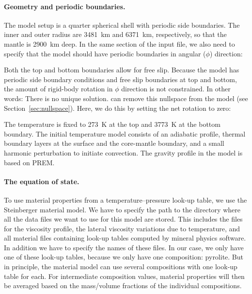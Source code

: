 \paragraph{Geometry and periodic boundaries.}
The model setup is a quarter spherical shell with periodic side boundaries. The inner and outer radius are 3481~\si{\km} and 6371~\si{\km}, respectively, so that the mantle is 2900~\si{\km} deep. In the same section of the input file, we also need to specify that the model should have periodic boundaries in angular ($\phi$) direction:

Both the top and bottom boundaries allow for free slip. Because the model has periodic side boundary conditions and free slip boundaries at top and bottom, the amount of rigid-body rotation in $\phi$ direction is not constrained. In other words: There is no unique solution. \aspect{} can remove this nullspace from the model (see Section~\ref{sec:nullspace}). Here, we do this by setting the net rotation to zero:

The temperature is fixed to 273~\si{\K} at the top and 3773~\si{\K} at the bottom boundary.
The initial temperature model consists of an adiabatic profile,
thermal boundary layers at the surface and the core-mantle boundary, 
and a small harmonic perturbation to initiate convection.
The gravity profile in the model is based on PREM. 

\paragraph{The equation of state.}
To use material properties from a temperature--pressure look-up table, we use the Steinberger material model. We have to specify the path to the directory where all the data files we want to use for this model are stored. This includes the files for the viscosity profile, the lateral viscosity variations due to temperature, and all material files containing look-up tables computed by mineral physics software.
In addition we have to specify the names of these files. 
In our case, we only have one of these look-up tables, because we only have one composition: pyrolite. 
But in principle, the material model can use several compositions with one look-up table for each. 
For intermediate composition values, material properties will then be averaged based on the mass/volume fractions of the individual compositions. 


